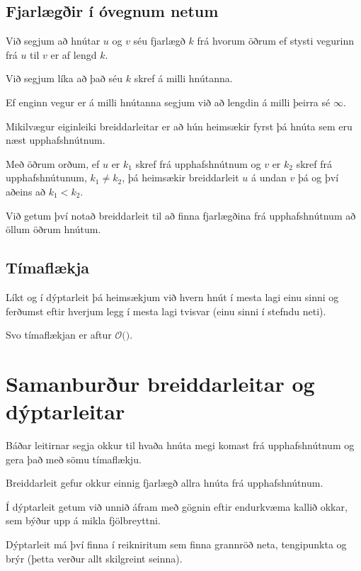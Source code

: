 \subsection{Fjarlægðir í óvegnum netum}
{
    {
        \item<1-> Við segjum að hnútar $u$ og $v$ séu fjarlægð $k$ frá hvorum öðrum ef stysti vegurinn frá $u$ til $v$ er af lengd $k$.
        \item<2-> Við segjum líka að það séu $k$ skref á milli hnútanna.
        \item<3-> Ef enginn vegur er á milli hnútanna segjum við að lengdin á milli þeirra sé $\infty$.
        \item<4-> Mikilvægur eiginleiki breiddarleitar er að hún heimsækir fyrst þá hnúta sem eru næst upphafshnútnum.
        \item<5-> Með öðrum orðum, ef $u$ er $k_1$ skref frá upphafshnútnum og $v$ er $k_2$ skref frá upphafshnútunum, $k_1 \neq k_2$,
                    þá heimsækir breiddarleit $u$ á undan $v$ þá og því aðeins að $k_1 < k_2$.
        \item<6-> Við getum því notað breiddarleit til að finna fjarlægðina frá upphafshnútnum að öllum öðrum hnútum.
    }
}

\subsection{Tímaflækja}
{
    {
        \item<1-> Líkt og í dýptarleit þá heimsækjum við hvern hnút í mesta lagi einu sinni og
                    ferðumst eftir hverjum legg í mesta lagi tvisvar (einu sinni í stefndu neti).
        \item<2-> Svo tímaflækjan er aftur $\mathcal{O}($$)$.
    }
}

\section{Samanburður breiddarleitar og dýptarleitar}
{
    {
        \item<1-> Báðar leitirnar segja okkur til hvaða hnúta megi komast frá upphafshnútnum og gera það með sömu tímaflækju.
        \item<2-> Breiddarleit gefur okkur einnig fjarlægð allra hnúta frá upphafshnútnum.
        \item<3-> Í dýptarleit getum við unnið áfram með gögnin eftir endurkvæma kallið okkar, sem býður upp á mikla fjölbreyttni.
        \item<4-> Dýptarleit má því finna í reikniritum sem finna grannröð neta, tengipunkta og brýr (þetta verður allt skilgreint seinna).
    }
}

